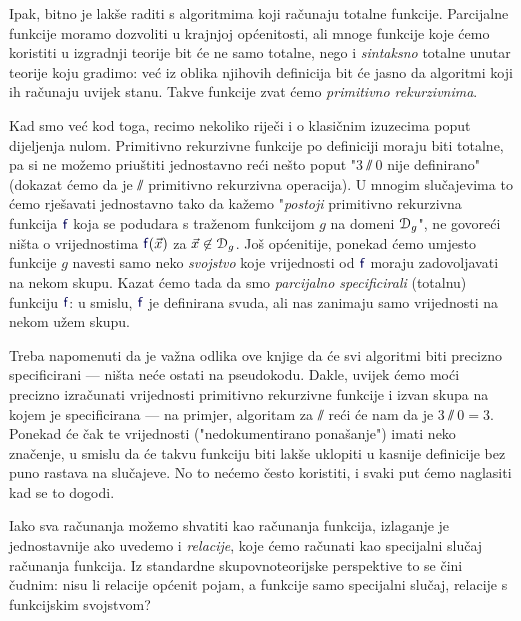 Ipak, bitno je  lakše raditi s algoritmima koji računaju totalne funkcije. Parcijalne funkcije moramo dozvoliti u krajnjoj općenitosti, ali mnoge funkcije koje ćemo koristiti u izgradnji teorije bit će ne samo totalne, nego i \emph{sintaksno} totalne unutar teorije koju gradimo: već iz oblika njihovih definicija bit će jasno da algoritmi koji ih računaju uvijek stanu. Takve funkcije zvat ćemo \emph{primitivno rekurzivnima}.

Kad smo već kod toga, recimo nekoliko riječi i o klasičnim izuzecima poput dijeljenja nulom. Primitivno rekurzivne funkcije po definiciji moraju biti totalne, pa si ne možemo priuštiti jednostavno reći nešto poput "$3\sslash0$ nije definirano" (dokazat ćemo da je $\sslash$ primitivno rekurzivna operacija). U mnogim slučajevima to ćemo rješavati jednostavno tako da kažemo "\emph{postoji} primitivno rekurzivna funkcija $\f{f}$ koja se podudara s traženom funkcijom $g$ na domeni $\mathcal D_{g}$", ne govoreći ništa o vrijednostima $\f{f}(\vec x)$ za $\vec x\not\in\mathcal D_{g}$. Još općenitije, ponekad ćemo umjesto funkcije $g$ navesti samo neko \emph{svojstvo} koje vrijednosti od $\f{f}$ moraju zadovoljavati na nekom skupu. Kazat ćemo tada da smo \emph{parcijalno specificirali} (totalnu) funkciju $\f{f}$: u smislu, $\f{f}$ je definirana svuda, ali nas zanimaju samo vrijednosti na nekom užem skupu.

Treba napomenuti da je važna odlika ove knjige da će svi algoritmi biti precizno specificirani --- ništa neće ostati na pseudokodu. Dakle, uvijek ćemo moći precizno izračunati vrijednosti primitivno rekurzivne funkcije i izvan skupa na kojem je specificirana --- na primjer, algoritam za $\sslash$ reći će nam da je $3\sslash 0=3$. Ponekad će čak te vrijednosti ("nedokumentirano ponašanje") imati neko značenje, u smislu da će takvu funkciju biti lakše uklopiti u kasnije definicije bez puno rastava na slučajeve. No to nećemo često koristiti, i svaki put ćemo naglasiti kad se to dogodi.


Iako sva računanja možemo shvatiti kao računanja funkcija, izlaganje je jednostavnije ako uvedemo i \emph{relacije}, koje ćemo računati kao specijalni slučaj računanja funkcija. Iz standardne skupovnoteorijske perspektive to se čini čudnim: nisu li relacije općenit pojam, a funkcije samo specijalni slučaj, relacije s funkcijskim svojstvom?

